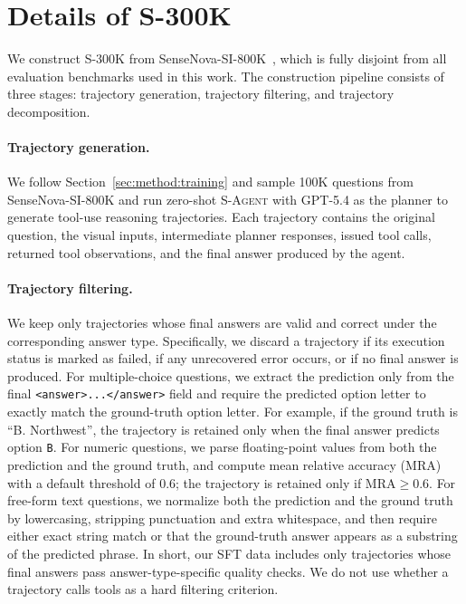 \documentclass{llmxive}
\begin{document}
\section{Details of \textsc{S-300K}}
\label{app:training_data}

We construct \textsc{S-300K} from SenseNova-SI-800K~\citep{sensenova_si}, which is fully disjoint from all evaluation benchmarks used in this work. 
The construction pipeline consists of three stages: trajectory generation, trajectory filtering, and trajectory decomposition.

\paragraph{Trajectory generation.}
We follow Section~\ref{sec:method:training} and sample 100K questions from SenseNova-SI-800K and run zero-shot \textsc{S-Agent} with GPT-5.4 as the planner to generate tool-use reasoning trajectories. 
Each trajectory contains the original question, the visual inputs, intermediate planner responses, issued tool calls, returned tool observations, and the final answer produced by the agent.

\paragraph{Trajectory filtering.}
We keep only trajectories whose final answers are valid and correct under the corresponding answer type. 
Specifically, we discard a trajectory if its execution status is marked as failed, if any unrecovered error occurs, or if no final answer is produced. 
For multiple-choice questions, we extract the prediction only from the final \texttt{<answer>...</answer>} field and require the predicted option letter to exactly match the ground-truth option letter. 
For example, if the ground truth is ``B. Northwest'', the trajectory is retained only when the final answer predicts option \texttt{B}. 
For numeric questions, we parse floating-point values from both the prediction and the ground truth, and compute mean relative accuracy (MRA) with a default threshold of 0.6; the trajectory is retained only if $\mathrm{MRA} \geq 0.6$. 
For free-form text questions, we normalize both the prediction and the ground truth by lowercasing, stripping punctuation and extra whitespace, and then require either exact string match or that the ground-truth answer appears as a substring of the predicted phrase. 
In short, our SFT data includes only trajectories whose final answers pass answer-type-specific quality checks. 
We do not use whether a trajectory calls tools as a hard filtering criterion.
\end{document}
